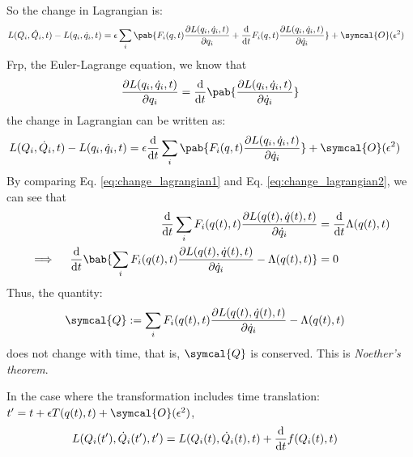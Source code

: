 So the change in Lagrangian is:
\begin{align}
  L(Q_i, \dot{Q}_i, t) - L(q_i, \dot{q}_i, t) & = \epsilon \sum_i \pab{
    F_i(q, t) \pdv{L(q_i, \dot{q}_i, t)}{q_i} + \odv{}{t} F_i(q, t) \pdv{L(q_i, \dot{q}_i, t)}{\dot{q}_i}
  } + \symcal{O}(\epsilon^2)
\end{align}
Frp, the Euler-Lagrange equation, we know that
\begin{align}
  \pdv{L(q_i, \dot{q}_i, t)}{q_i} = \odv{}{t} \pab{\pdv{L(q_i, \dot{q}_i, t)}{\dot{q}_i}}
\end{align}
the change in Lagrangian can be written as:
\begin{align}
  L(Q_i, \dot{Q}_i, t) - L(q_i, \dot{q}_i, t) & = \epsilon \odv{}{t} \sum_i \pab{
    F_i(q, t) \pdv{L(q_i, \dot{q}_i, t)}{\dot{q}_i}
  } + \symcal{O}(\epsilon^2)
  \label{eq:change_lagrangian2}
\end{align}
By comparing Eq. \eqref{eq:change_lagrangian1} and Eq. \eqref{eq:change_lagrangian2}, we can see that
\begin{align}
  \odv{}{t} \sum_i F_i(q(t), t) \pdv{L(q(t), \dot{q}(t), t)}{\dot{q}_i} & = \odv{}{t} \Lambda(q(t), t) \\
  \implies \quad \odv{}{t} \bab{
    \sum_i F_i(q(t), t) \pdv{L(q(t), \dot{q}(t), t)}{\dot{q}_i} - \Lambda(q(t), t)
  }                                                                     & = 0
\end{align}
Thus, the quantity:
\begin{align}
  \symcal{Q} & := \sum_i F_i(q(t), t) \pdv{L(q(t), \dot{q}(t), t)}{\dot{q}_i} - \Lambda(q(t), t)
\end{align}
does not change with time, that is, $\symcal{Q}$ is conserved.
This is \emph{Noether's theorem}.

In the case where the transformation includes time translation: $t' = t + \epsilon T(q(t), t) + \symcal{O}(\epsilon^2)$,
\begin{align}
  L(Q_i(t'), \dot{Q}_i(t'), t') & = L(Q_i(t), \dot{Q}_i(t), t) + \odv{}{t} f(Q_i(t), t)
\end{align}




\cite{hachiware-analyticalMechanics}